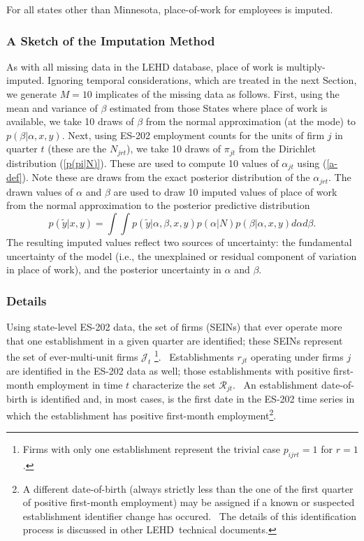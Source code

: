 For all states other than Minnesota, place-of-work for employees is imputed.

\subsubsection{A Sketch of the Imputation Method}

As with all missing data in the LEHD database, place of work is
multiply-imputed. Ignoring temporal considerations, which are treated in the
next Section, we generate $M=10$ implicates of the missing data as follows.
First, using the mean and variance of $\beta $ estimated from those States
where place of work is available, we take 10 draws of $\beta $ from the
normal approximation (at the mode) to $p\left( \beta |\alpha ,x,y\right) .$
Next, using ES-202 employment counts for the units of firm $j$ in quarter $t$
(these are the $N_{jrt}$), we take 10 draws of $\pi _{jt}$ from the
Dirichlet distribution (\ref{p(pi|N)}). These are used to compute 10 values
of $\alpha _{jt}$ using (\ref{a-def}). Note these are draws from the exact
posterior distribution of the $\alpha _{jrt}.$ The drawn values of $\alpha $
and $\beta $ are used to draw 10 imputed values of place of work from the
normal approximation to the posterior predictive distribution%
\begin{equation}
p\left( \tilde{y}|x,y\right) =\int \int p\left( \tilde{y}|\alpha ,\beta
,x,y\right) p\left( \alpha |N\right) p\left( \beta |\alpha ,x,y\right)
d\alpha d\beta .  \label{post-pred}
\end{equation}%
The resulting imputed values reflect two sources of uncertainty: the
fundamental uncertainty of the model (i.e., the unexplained or residual
component of variation in place of work), and the posterior uncertainty in $%
\alpha $ and $\beta $.

\subsubsection{Details}

Using state-level ES-202 data, the set of firms (SEINs) that ever operate
more that one establishment in a given quarter are identified; these SEINs
represent the set of ever-multi-unit firms $\mathcal{J}_{t}$ \footnote{%
Firms with only one establishment represent the trivial case $p_{ijrt}=1$
for $r=1$.}. \ Establishments $r_{jt}$ operating under firms $j$ are
identified in the ES-202 data as well; those establishments with positive
first-month employment in time $t$ characterize the set $\mathcal{R}_{jt}$.
\ An establishment date-of-birth is identified and, in most cases, is the
first date in the ES-202 time series in which the establishment has positive
first-month employment\footnote{%
A different date-of-birth (always strictly less than the one of the first
quarter of positive first-month employment) may be assigned if a known or
suspected establishment identifier change has occured. \ The details of this
identification process is discussed in other LEHD\ technical documents.}. 

